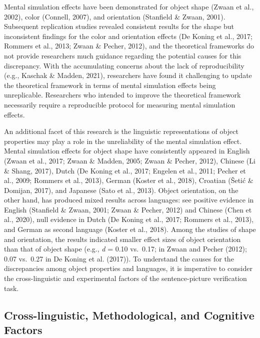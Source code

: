 \documentclass[
  man,floatsintext]{apa7}
\begin{document}
Mental simulation effects have been demonstrated for object shape
(Zwaan et al., 2002), color
(Connell, 2007), and orientation
(Stanfield \& Zwaan, 2001). Subsequent replication studies revealed
consistent results for the shape but inconsistent findings for the color
and orientation effects (De Koning et al., 2017; Rommers et al., 2013; Zwaan \& Pecher, 2012), and the theoretical frameworks do
not provide researchers much guidance regarding the potential causes for
this discrepancy. With the accumulating concerns about the lack of
reproducibility (e.g., Kaschak \& Madden, 2021), researchers
have found it challenging to update the theoretical framework in terms
of mental simulation effects being unreplicable. Researchers who
intended to improve the theoretical framework necessarily require a
reproducible protocol for measuring mental simulation effects.

An additional facet of this research is the linguistic representations
of object properties may play a role in the unreliability of the mental
simulation effect. Mental simulation effects for object shape have
consistently appeared in English
(Zwaan et al., 2017; Zwaan \& Madden, 2005; Zwaan \& Pecher, 2012), Chinese (Li \& Shang, 2017),
Dutch (De Koning et al., 2017; Engelen et al., 2011; Pecher et al., 2009; Rommers et al., 2013), German
(Koster et al., 2018), Croatian
(Šetić \& Domijan, 2017), and Japanese
(Sato et al., 2013). Object orientation, on the other hand, has
produced mixed results across languages: see positive evidence in
English (Stanfield \& Zwaan, 2001; Zwaan \& Pecher, 2012)
and Chinese (Chen et al., 2020), null evidence in Dutch
(De Koning et al., 2017; Rommers et al., 2013), and German as
second language (Koster et al., 2018). Among the studies
of shape and orientation, the results indicated smaller effect sizes of
object orientation than that of object shape (e.g., \emph{d} = 0.10 vs.~0.17;
in Zwaan and Pecher (2012); 0.07 vs.~0.27 in
De Koning et al. (2017)). To understand the causes for the discrepancies
among object properties and languages, it is imperative to consider the
cross-linguistic and experimental factors of the sentence-picture
verification task.

\hypertarget{cross-linguistic-methodological-and-cognitive-factors}{%
\subsection{Cross-linguistic, Methodological, and Cognitive Factors}\label{cross-linguistic-methodological-and-cognitive-factors}}
\end{document}
